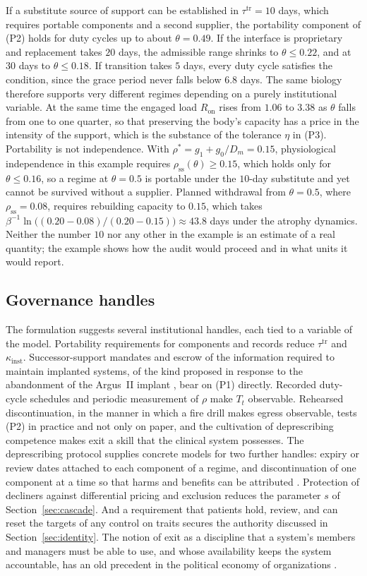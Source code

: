 \documentclass[11pt]{article}
\theoremstyle{plain}
\theoremstyle{definition}
\theoremstyle{remark}
\begin{document}
If a substitute source of support can be established in $\tau^{\mathrm{tr}}=10$ days, which requires portable components and a second supplier, the portability component of (P2) holds for duty cycles up to about $\theta=0.49$. If the interface is proprietary and replacement takes $20$ days, the admissible range shrinks to $\theta\le0.22$, and at $30$ days to $\theta\le0.18$. If transition takes $5$ days, every duty cycle satisfies the condition, since the grace period never falls below $6.8$ days. The same biology therefore supports very different regimes depending on a purely institutional variable. At the same time the engaged load $R_{\mathrm{on}}$ rises from $1.06$ to $3.38$ as $\theta$ falls from one to one quarter, so that preserving the body's capacity has a price in the intensity of the support, which is the substance of the tolerance $\eta$ in (P3). Portability is not independence. With $\rho^\ast=g_1+g_0/D_m=0.15$, physiological independence in this example requires $\rho_{\mathrm{ss}}(\theta)\ge0.15$, which holds only for $\theta\le0.16$, so a regime at $\theta=0.5$ is portable under the $10$-day substitute and yet cannot be survived without a supplier. Planned withdrawal from $\theta=0.5$, where $\rho_{\mathrm{ss}}=0.08$, requires rebuilding capacity to $0.15$, which takes $\beta^{-1}\ln\big((0.20-0.08)/(0.20-0.15)\big)\approx43.8$ days under the atrophy dynamics. Neither the number $10$ nor any other in the example is an estimate of a real quantity; the example shows how the audit would proceed and in what units it would report.

\subsection{Governance handles}

The formulation suggests several institutional handles, each tied to a variable of the model. Portability requirements for components and records reduce $\tau^{\mathrm{tr}}$ and $\kappa_{\mathrm{inst}}$. Successor-support mandates and escrow of the information required to maintain implanted systems, of the kind proposed in response to the abandonment of the Argus~II implant \cite{jazwinska2022}, bear on (P1) directly. Recorded duty-cycle schedules and periodic measurement of $\rho$ make $T_t$ observable. Rehearsed discontinuation, in the manner in which a fire drill makes egress observable, tests (P2) in practice and not only on paper, and the cultivation of deprescribing competence makes exit a skill that the clinical system possesses. The deprescribing protocol supplies concrete models for two further handles: expiry or review dates attached to each component of a regime, and discontinuation of one component at a time so that harms and benefits can be attributed \cite{scott2015}. Protection of decliners against differential pricing and exclusion reduces the parameter $s$ of Section~\ref{sec:cascade}. And a requirement that patients hold, review, and can reset the targets of any control on traits secures the authority discussed in Section~\ref{sec:identity}. The notion of exit as a discipline that a system's members and managers must be able to use, and whose availability keeps the system accountable, has an old precedent in the political economy of organizations \cite{hirschman1970}.
\end{document}
